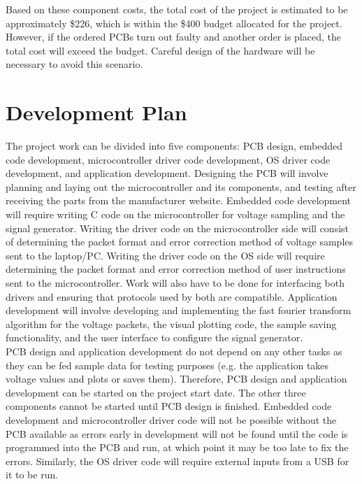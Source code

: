 \documentclass[letterpaper,12pt]{article}
\begin{document}
\noindent
Based on these component costs, the total cost of the project is estimated to be
approximately \$226, which is within the \$400 budget allocated for the project.
However, if the ordered PCBs turn out faulty and another order is placed, the
total cost will exceed the budget. Careful design of the hardware will be
necessary to avoid this scenario.

\section{Development Plan} %
The project work can be divided into five components: PCB design, embedded code
development, microcontroller driver code development, OS driver code
development, and application development. Designing the PCB will involve
planning and laying out the microcontroller and its components, and testing
after receiving the parts from the manufacturer website. Embedded code
development will require writing C code on the microcontroller for voltage
sampling and the signal generator. Writing the driver code on the
microcontroller side will consist of determining the packet format and error
correction method of voltage samples sent to the laptop/PC. Writing the driver
code on the OS side will require determining the packet format and error
correction method of user instructions sent to the microcontroller. Work will
also have to be done for interfacing both drivers and ensuring that protocols
used by both are compatible. Application development will involve developing and
implementing the fast fourier transform algorithm for the voltage packets, the
visual plotting code, the sample saving functionality, and the user interface to
configure the signal generator. \\

\noindent
PCB design and application development do not depend on any other tasks as they
can be fed sample data for testing purposes (e.g. the application takes voltage
values and plots or saves them). Therefore, PCB design and application
development can be started on the project start date. The other three components
cannot be started until PCB design is finished. Embedded code development and
microcontroller driver code will not be possible without the PCB available as
errors early in development will not be found until the code is programmed into
the PCB and run, at which point it may be too late to fix the errors. Similarly,
the OS driver code will require external inputs from a USB for it to be run. \\
\end{document}
